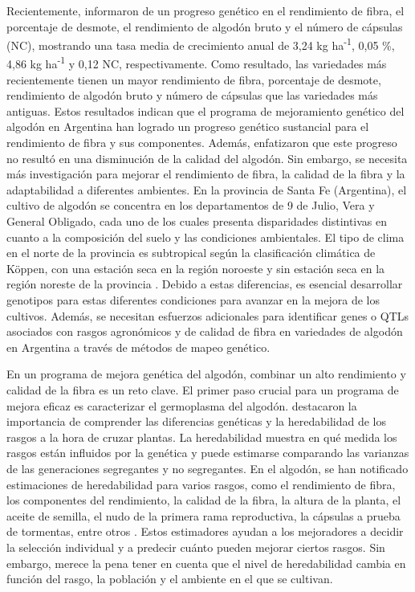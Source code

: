 \documentclass[12pt,oneside]{reedthesis}
\begin{document}
Recientemente, \textcite{scarpin2022} informaron de un progreso genético en el rendimiento de fibra, el porcentaje de desmote, el rendimiento de algodón bruto y el número de cápsulas (NC), mostrando una tasa media de crecimiento anual de 3,24 kg ha\textsuperscript{-1}, 0,05 \%, 4,86 kg ha\textsuperscript{-1} y 0,12 NC, respectivamente. Como resultado, las variedades más recientemente tienen un mayor rendimiento de fibra, porcentaje de desmote, rendimiento de algodón bruto y número de cápsulas que las variedades más antiguas. Estos resultados indican que el programa de mejoramiento genético del algodón en Argentina han logrado un progreso genético sustancial para el rendimiento de fibra y sus componentes. Además, \textcite{scarpin2023} enfatizaron que este progreso no resultó en una disminución de la calidad del algodón. Sin embargo, se necesita más investigación para mejorar el rendimiento de fibra, la calidad de la fibra y la adaptabilidad a diferentes ambientes. En la provincia de Santa Fe (Argentina), el cultivo de algodón se concentra en los departamentos de 9 de Julio, Vera y General Obligado, cada uno de los cuales presenta disparidades distintivas en cuanto a la composición del suelo y las condiciones ambientales. El tipo de clima en el norte de la provincia es subtropical según la clasificación climática de Köppen, con una estación seca en la región noroeste y sin estación seca en la región noreste de la provincia \autocite{anida2024}. Debido a estas diferencias, es esencial desarrollar genotipos para estas diferentes condiciones para avanzar en la mejora de los cultivos. Además, se necesitan esfuerzos adicionales para identificar genes o QTLs asociados con rasgos agronómicos y de calidad de fibra en variedades de algodón en Argentina a través de métodos de mapeo genético.

En un programa de mejora genética del algodón, combinar un alto rendimiento y calidad de la fibra es un reto clave. El primer paso crucial para un programa de mejora eficaz es caracterizar el germoplasma del algodón. \textcite{kearsey1996} destacaron la importancia de comprender las diferencias genéticas y la heredabilidad de los rasgos a la hora de cruzar plantas. La heredabilidad muestra en qué medida los rasgos están influidos por la genética y puede estimarse comparando las varianzas de las generaciones segregantes y no segregantes. En el algodón, se han notificado estimaciones de heredabilidad para varios rasgos, como el rendimiento de fibra, los componentes del rendimiento, la calidad de la fibra, la altura de la planta, el aceite de semilla, el nudo de la primera rama reproductiva, la cápsulas a prueba de tormentas, entre otros \autocite{meredith1984,tang1996,ribeiro2017,decarvalho2022,nidagundi2023}. Estos estimadores ayudan a los mejoradores a decidir la selección individual y a predecir cuánto pueden mejorar ciertos rasgos. Sin embargo, merece la pena tener en cuenta que el nivel de heredabilidad cambia en función del rasgo, la población y el ambiente en el que se cultivan.
\end{document}
